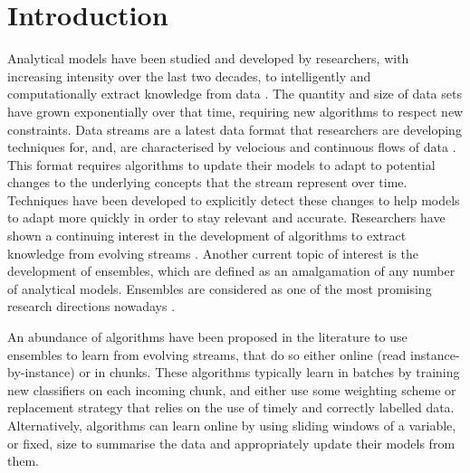 
\chapter{Introduction\label{chapter:introduction}} %


\newcommand{\keyword}[1]{\textbf{#1}}
\newcommand{\tabhead}[1]{\textbf{#1}}
\newcommand{\code}[1]{\texttt{#1}}
\newcommand{\file}[1]{\texttt{\bfseries#1}}
\newcommand{\option}[1]{\texttt{\itshape#1}}

Analytical models have been studied and developed by researchers, with increasing intensity over the last two decades, to intelligently and computationally extract knowledge from data \cite{bifet2009data}. The quantity and size of data sets have grown exponentially over that time, requiring new algorithms to respect new constraints. Data streams are a latest data format that researchers are developing techniques for, and, are characterised by velocious and continuous flows of data \cite{krempl2014open}. This format requires algorithms to update their models to adapt to potential changes to the underlying concepts that the stream represent over time. Techniques have been developed to explicitly detect these changes to help models to adapt more quickly in order to stay relevant and accurate. Researchers have shown a continuing interest in the development of algorithms to extract knowledge from evolving streams \cite{gama2010knowledge, gama2014survey, ghesmoune2016state, KRAWCZYK2017132, krempl2014open, silva2013data, widmer1996learning}. Another current topic of interest is the development of ensembles, which are defined as an amalgamation of any number of analytical models. Ensembles are considered as one of the most promising research directions nowadays \cite{jain2000statistical, KRAWCZYK2017132, oza2008classifier, polikar2006ensemble, rokach2009taxonomy, wozniak2014survey}.

An abundance of algorithms have been proposed in the literature to use ensembles to learn from evolving streams, that do so either online (read instance-by-instance) or in chunks. These algorithms typically learn in batches by training new classifiers on each incoming chunk, and either use some weighting scheme or replacement strategy that relies on the use of timely and correctly labelled data. Alternatively, algorithms can learn online by using sliding windows of a variable, or fixed, size to summarise the data and appropriately update their models from them.

